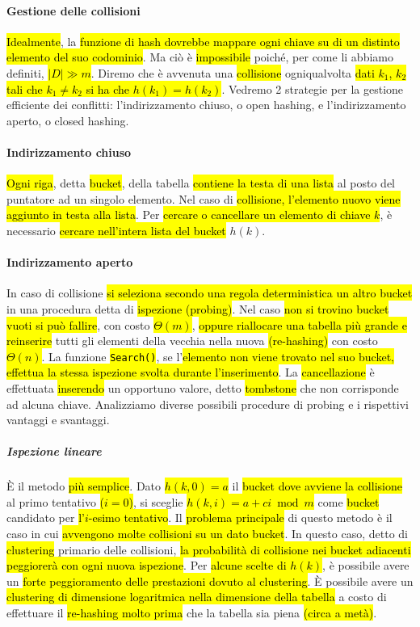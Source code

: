 \documentclass[a4paper,11pt,twoside]{article}
\theoremstyle{plain}
\theoremstyle{definition}
\theoremstyle{remark}
\begin{document}
\paragraph{Gestione delle collisioni} \hl{Idealmente}, la \hl{funzione di hash
dovrebbe mappare ogni chiave su di un distinto elemento del suo codominio}. Ma
ciò è \hl{impossibile} poiché, per come li abbiamo definiti, \hl{$|D| \gg m$}.
Diremo che è avvenuta una \hl{collisione} ogniqualvolta \hl{dati $k_1$, $k_2$
tali che $k_1 \neq k_2$ si ha che $h(k_1) = h(k_2)$}. Vedremo 2 strategie per la
gestione efficiente dei conflitti: l'indirizzamento chiuso, o open hashing, e
l'indirizzamento aperto, o closed hashing.

\paragraph{Indirizzamento chiuso} \hl{Ogni riga}, detta \hl{bucket}, della
tabella \hl{contiene la testa di una lista} al posto del puntatore ad un singolo
elemento. Nel caso di \hl{collisione, l'elemento nuovo viene aggiunto in testa
alla lista}. Per \hl{cercare o cancellare un elemento di chiave $k$}, è
necessario \hl{cercare nell'intera lista del bucket} $h(k)$.

\paragraph{Indirizzamento aperto} In caso di collisione \hl{si seleziona secondo
una regola deterministica un altro bucket} in una procedura detta di
\hl{ispezione (probing)}. Nel caso \hl{non si trovino bucket vuoti si può
fallire}, con costo \hl{$\Theta(m)$}, \hl{oppure riallocare una tabella più
grande e reinserire} tutti gli elementi della vecchia nella nuova
\hl{(re-hashing)} con costo \hl{$\Theta(n)$}. La funzione
\hl{\texttt{Search()}}, se l'\hl{elemento non viene trovato nel suo bucket,
effettua la stessa ispezione svolta durante l'inserimento}. La
\hl{cancellazione} è effettuata \hl{inserendo} un opportuno valore, detto
\hl{tombstone} che non corrisponde ad alcuna chiave. Analizziamo diverse
possibili procedure di probing e i rispettivi vantaggi e svantaggi.

\subparagraph{Ispezione lineare} È il metodo \hl{più semplice}. Dato \hl{$h(k,
0) = a$} il \hl{bucket dove avviene la collisione} al primo tentativo \hl{($i =
0$)}, si sceglie \hl{$h(k,i) = a + ci \bmod m$} come \hl{bucket} candidato per
\hl{l'$i$-esimo tentativo}. Il \hl{problema principale} di questo metodo è il
caso in cui \hl{avvengono molte collisioni su un dato bucket}. In questo caso,
detto di \hl{clustering} primario delle collisioni, \hl{la probabilità di collisione nei
bucket adiacenti peggiorerà con ogni nuova ispezione}. Per \hl{alcune
scelte di $h(k)$}, è possibile avere un \hl{forte peggioramento delle
prestazioni dovuto al clustering}. È possibile avere un \hl{clustering di
dimensione logaritmica nella dimensione della tabella} a costo di effettuare il
\hl{re-hashing molto prima} che la tabella sia piena \hl{(circa a metà)}.
\end{document}

